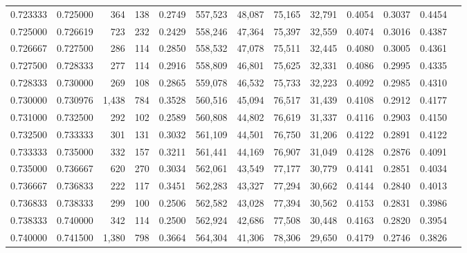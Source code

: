 \begin{tabular}{rrrrrrrrrrrrr}
0.723333 & 0.725000 &   364 & 138 &                                     0.2749 & 557,523 &  48,087 &  75,165 &  32,791 & 0.4054 & 0.3037 & 0.4454 \\
0.725000 & 0.726619 &   723 & 232 &                                     0.2429 & 558,246 &  47,364 &  75,397 &  32,559 & 0.4074 & 0.3016 & 0.4387 \\
0.726667 & 0.727500 &   286 & 114 &                                     0.2850 & 558,532 &  47,078 &  75,511 &  32,445 & 0.4080 & 0.3005 & 0.4361 \\
0.727500 & 0.728333 &   277 & 114 &                                     0.2916 & 558,809 &  46,801 &  75,625 &  32,331 & 0.4086 & 0.2995 & 0.4335 \\
0.728333 & 0.730000 &   269 & 108 &                                     0.2865 & 559,078 &  46,532 &  75,733 &  32,223 & 0.4092 & 0.2985 & 0.4310 \\
0.730000 & 0.730976 & 1,438 & 784 &                                     0.3528 & 560,516 &  45,094 &  76,517 &  31,439 & 0.4108 & 0.2912 & 0.4177 \\
0.731000 & 0.732500 &   292 & 102 &                                     0.2589 & 560,808 &  44,802 &  76,619 &  31,337 & 0.4116 & 0.2903 & 0.4150 \\
0.732500 & 0.733333 &   301 & 131 &                                     0.3032 & 561,109 &  44,501 &  76,750 &  31,206 & 0.4122 & 0.2891 & 0.4122 \\
0.733333 & 0.735000 &   332 & 157 &                                     0.3211 & 561,441 &  44,169 &  76,907 &  31,049 & 0.4128 & 0.2876 & 0.4091 \\
0.735000 & 0.736667 &   620 & 270 &                                     0.3034 & 562,061 &  43,549 &  77,177 &  30,779 & 0.4141 & 0.2851 & 0.4034 \\
0.736667 & 0.736833 &   222 & 117 &                                     0.3451 & 562,283 &  43,327 &  77,294 &  30,662 & 0.4144 & 0.2840 & 0.4013 \\
0.736833 & 0.738333 &   299 & 100 &                                     0.2506 & 562,582 &  43,028 &  77,394 &  30,562 & 0.4153 & 0.2831 & 0.3986 \\
0.738333 & 0.740000 &   342 & 114 &                                     0.2500 & 562,924 &  42,686 &  77,508 &  30,448 & 0.4163 & 0.2820 & 0.3954 \\
0.740000 & 0.741500 & 1,380 & 798 &                                     0.3664 & 564,304 &  41,306 &  78,306 &  29,650 & 0.4179 & 0.2746 & 0.3826 \\

\end{tabular}
